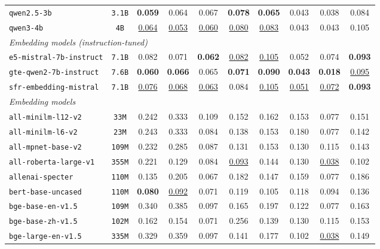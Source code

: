 \documentclass[11pt]{article}
\begin{document}
\begin{table}[htbp]
{\begin{tabular}{lccccccccc}
\texttt{qwen2.5-3b} & \texttt{3.1B} & \textbf{0.059} & 0.064 & 0.067 & \textbf{0.078} & \textbf{0.065} & 0.043 & 0.038 & 0.084 \\
\texttt{qwen3-4b} & \texttt{4B} & \underline{0.064} & \underline{0.053} & \underline{0.060} & \underline{0.080} & \underline{0.083} & 0.043 & 0.043 & 0.105 \\
\midrule
\multicolumn{10}{l}{\textit{Embedding models (instruction-tuned)}} \\
\midrule
\texttt{e5-mistral-7b-instruct} & \texttt{7.1B} & 0.082 & 0.071 & \textbf{0.062} & \underline{0.082} & \underline{0.105} & 0.052 & 0.074 & \textbf{0.093} \\
\texttt{gte-qwen2-7b-instruct} & \texttt{7.6B} & \textbf{0.060} & \textbf{0.066} & 0.065 & \textbf{0.071} & \textbf{0.090} & \textbf{0.043} & \textbf{0.018} & \underline{0.095} \\
\texttt{sfr-embedding-mistral} & \texttt{7.1B} & \underline{0.076} & \underline{0.068} & \underline{0.063} & 0.084 & \underline{0.105} & \underline{0.051} & \underline{0.072} & \textbf{0.093} \\
\midrule
\multicolumn{10}{l}{\textit{Embedding models}} \\
\midrule
\texttt{all-minilm-l12-v2} & \texttt{33M} & 0.242 & 0.333 & 0.109 & 0.152 & 0.162 & 0.153 & 0.077 & 0.151 \\
\texttt{all-minilm-l6-v2} & \texttt{23M} & 0.243 & 0.333 & 0.084 & 0.138 & 0.153 & 0.180 & 0.077 & 0.142 \\
\texttt{all-mpnet-base-v2} & \texttt{109M} & 0.232 & 0.285 & 0.087 & 0.131 & 0.153 & 0.130 & 0.115 & 0.143 \\
\texttt{all-roberta-large-v1} & \texttt{355M} & 0.221 & 0.129 & 0.084 & \underline{0.093} & 0.144 & 0.130 & \underline{0.038} & 0.102 \\
\texttt{allenai-specter} & \texttt{110M} & 0.135 & 0.205 & 0.067 & 0.182 & 0.147 & 0.159 & 0.077 & 0.186 \\
\texttt{bert-base-uncased} & \texttt{110M} & \textbf{0.080} & \underline{0.092} & 0.071 & 0.119 & 0.105 & 0.118 & 0.094 & 0.136 \\
\texttt{bge-base-en-v1.5} & \texttt{109M} & 0.340 & 0.385 & 0.097 & 0.165 & 0.197 & 0.122 & 0.077 & 0.163 \\
\texttt{bge-base-zh-v1.5} & \texttt{102M} & 0.162 & 0.154 & 0.071 & 0.256 & 0.139 & 0.130 & 0.115 & 0.153 \\
\texttt{bge-large-en-v1.5} & \texttt{335M} & 0.329 & 0.359 & 0.097 & 0.141 & 0.177 & 0.102 & \underline{0.038} & 0.149 \\

\end{tabular}}
\end{table}
\end{document}
